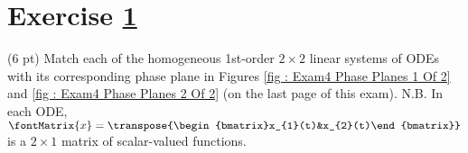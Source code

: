 




%
%
%
%

%

\section{Exercise \ref{sec : Math211 Summer2019 Exam4 Q2}}
\label{sec : Math211 Summer2019 Exam4 Q2}

(6 pt) Match each of the homogeneous 1st-order $2 \times 2$ linear systems of ODEs with its corresponding phase plane in Figures \ref{fig : Exam4 Phase Planes 1 Of 2} and \ref{fig : Exam4 Phase Planes 2 Of 2} (on the last page of this exam). N.B. In each ODE, $\fontMatrix{x} = \transpose{\begin{bmatrix}x_{1}(t)&x_{2}(t)\end{bmatrix}}$ is a $2 \times 1$ matrix of scalar-valued functions.

